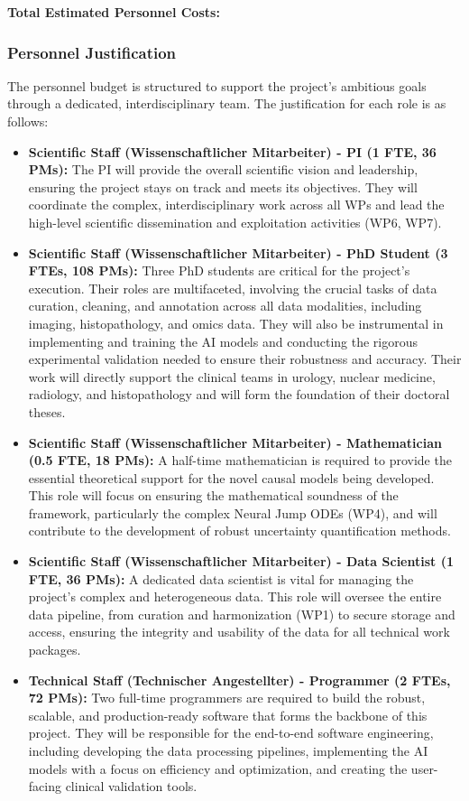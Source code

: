 \textbf{Total Estimated Personnel Costs: }

\subsubsection*{Personnel Justification}
The personnel budget is structured to support the project's ambitious goals through a dedicated, interdisciplinary team. The justification for each role is as follows:
\begin{itemize}
    \item \textbf{Scientific Staff (Wissenschaftlicher Mitarbeiter) - PI (1 FTE, 36 PMs):} The PI will provide the overall scientific vision and leadership, ensuring the project stays on track and meets its objectives. They will coordinate the complex, interdisciplinary work across all WPs and lead the high-level scientific dissemination and exploitation activities (WP6, WP7).
    \item \textbf{Scientific Staff (Wissenschaftlicher Mitarbeiter) - PhD Student (3 FTEs, 108 PMs):} Three PhD students are critical for the project's execution. Their roles are multifaceted, involving the crucial tasks of data curation, cleaning, and annotation across all data modalities, including imaging, histopathology, and omics data. They will also be instrumental in implementing and training the AI models and conducting the rigorous experimental validation needed to ensure their robustness and accuracy. Their work will directly support the clinical teams in urology, nuclear medicine, radiology, and histopathology and will form the foundation of their doctoral theses.
    \item \textbf{Scientific Staff (Wissenschaftlicher Mitarbeiter) - Mathematician (0.5 FTE, 18 PMs):} A half-time mathematician is required to provide the essential theoretical support for the novel causal models being developed. This role will focus on ensuring the mathematical soundness of the framework, particularly the complex Neural Jump ODEs (WP4), and will contribute to the development of robust uncertainty quantification methods.
    \item \textbf{Scientific Staff (Wissenschaftlicher Mitarbeiter) - Data Scientist (1 FTE, 36 PMs):} A dedicated data scientist is vital for managing the project's complex and heterogeneous data. This role will oversee the entire data pipeline, from curation and harmonization (WP1) to secure storage and access, ensuring the integrity and usability of the data for all technical work packages.
    \item \textbf{Technical Staff (Technischer Angestellter) - Programmer (2 FTEs, 72 PMs):} Two full-time programmers are required to build the robust, scalable, and production-ready software that forms the backbone of this project. They will be responsible for the end-to-end software engineering, including developing the data processing pipelines, implementing the AI models with a focus on efficiency and optimization, and creating the user-facing clinical validation tools.

\end{itemize}
